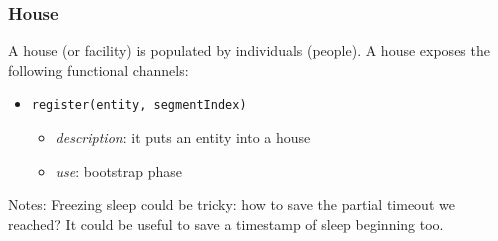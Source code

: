 \subsubsection{House}
A house (or facility) is populated by individuals (people).
A house exposes the following functional channels:
\begin{itemize}
	\item \texttt{register(entity, segmentIndex)}
	\begin{itemize}
		\item \textit{description}: it puts an entity into a house
		\item \textit{use}: bootstrap phase
	\end{itemize}
\end{itemize}
Notes:
Freezing sleep could be tricky: how to save the partial timeout we reached? It could be useful to save a timestamp of sleep beginning too.